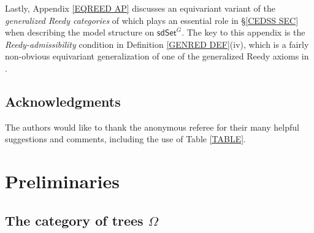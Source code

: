 \documentclass[a4paper,10pt
 ,draft
]{article}%
\begin{document}
Lastly, Appendix \ref{EQREED AP} discusses an equivariant variant of the \textit{generalized Reedy categories}
of \cite{BM11} which plays an essential role in \S \ref{CEDSS SEC}
when describing the model structure on $\mathsf{sdSet}^G$.
The key to this appendix is the \textit{Reedy-admissibility} condition in 
Definition \ref{GENRED DEF}(iv),
which is a fairly non-obvious equivariant generalization of one of the generalized Reedy axioms in \cite{BM11}.

\subsection{Acknowledgments}

The authors would like to thank the anonymous referee for their many helpful suggestions and comments, 
including the use of Table \ref{TABLE}.





\section{Preliminaries}\label{PREL SEC}

\subsection{The category of trees $\Omega$}
\end{document}
